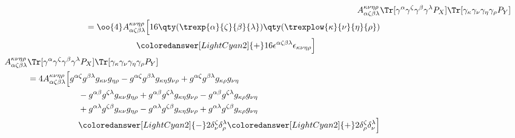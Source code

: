 \begin{align}
	A_{\alpha\zeta\beta\lambda}^{\kappa\nu\eta\rho}&
	\Tr[\gamma^\alpha\gamma^\zeta\gamma^\beta\gamma^\lambda P_{X}]
	\Tr[\gamma_\kappa\gamma_\nu\gamma_\eta\gamma_\rho P_{Y}]
	\\
	\begin{split}
		&=\oo{4}A_{\alpha\zeta\beta\lambda}^{\kappa\nu\eta\rho}
		\Big[
		16\qty(\trexp{\alpha}{\zeta}{\beta}{\lambda})
		\qty(\trexplow{\kappa}{\nu}{\eta}{\rho})
		\\
		&
		\qquad\qquad\qquad\coloredanswer[LightCyan2]{+}16\epsilon^{\alpha\zeta\beta\lambda}
		\epsilon_{\kappa\nu\eta\rho}
		\Big]
	\end{split}
	\\
	\begin{split}
		A_{\alpha\zeta\beta\lambda}^{\kappa\nu\eta\rho}&
		\Tr[\gamma^\alpha\gamma^\zeta\gamma^\beta\gamma^\lambda P_{X}]
		\Tr[\gamma_\kappa\gamma_\nu\gamma_\eta\gamma_\rho P_{Y}]
		\\
		&=4A_{\alpha\zeta\beta\lambda}^{\kappa\nu\eta\rho}
		\Big[
			g^{\alpha\zeta}g^{\beta\lambda}g_{\kappa\nu}g_{\eta\rho}
			-g^{\alpha\zeta}g^{\beta\lambda}g_{\kappa\eta}g_{\nu\rho}
			+g^{\alpha\zeta}g^{\beta\lambda}g_{\kappa\rho}g_{\nu\eta}
			\\
			&\qquad\qquad\qquad
			-g^{\alpha\beta}g^{\zeta\lambda}g_{\kappa\nu}g_{\eta\rho}
			+g^{\alpha\beta}g^{\zeta\lambda}g_{\kappa\eta}g_{\nu\rho}
			-g^{\alpha\beta}g^{\zeta\lambda}g_{\kappa\rho}g_{\nu\eta}
			\\
			&\qquad\qquad\qquad
			+g^{\alpha\lambda}g^{\zeta\beta}g_{\kappa\nu}g_{\eta\rho}
			-g^{\alpha\lambda}g^{\zeta\beta}g_{\kappa\eta}g_{\nu\rho}
			+g^{\alpha\lambda}g^{\zeta\beta}g_{\kappa\rho}g_{\nu\eta}
			\\
			&\qquad\qquad\qquad
			\coloredanswer[LightCyan2]{-}2\delta^\zeta_\nu\delta^\lambda_\rho
			\coloredanswer[LightCyan2]{+}2\delta^\zeta_\rho\delta^\lambda_\nu
		\Big]
	\end{split}
\end{align}
\newpage
